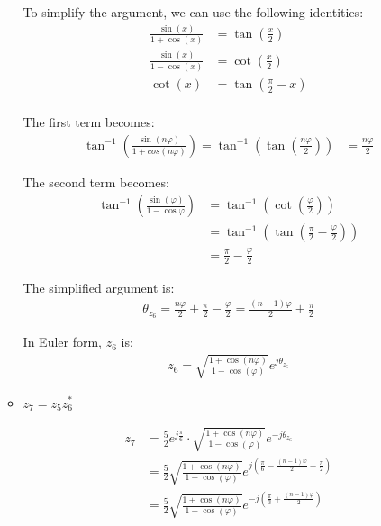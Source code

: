 \documentclass{article}
\begin{document}
\begin{enumerate}
\begin{itemize}
        To simplify the argument, we can use the following identities:
        \begin{align*}
            \frac{\sin(x)}{1+\cos(x)} &= \tan\left(\frac{x}{2}\right) \\
            \frac{\sin(x)}{1-\cos(x)} &= \cot\left(\frac{x}{2}\right) \\
            \cot(x) &= \tan\left(\frac{\pi}{2} - x\right) \\
        \end{align*}

        The first term becomes:
        \begin{align*}
            \tan^{-1}\left(\frac{\sin(n\varphi)}{1+cos(n\varphi)}\right) = \tan^{-1}\left(\tan\left(\frac{n\varphi}{2}\right)\right) &= \frac{n\varphi}{2}
        \end{align*}

        The second term becomes:
        \begin{align*}
            \tan^{-1}\left(\frac{\sin(\varphi)}{1-\cos{\varphi}}\right) &= \tan^{-1}\left(\cot\left(\frac{\varphi}{2}\right)\right) \\
            &= \tan^{-1}\left(\tan\left(\frac{\pi}{2} - \frac{\varphi}{2}\right)\right) \\
            &= \frac{\pi}{2} - \frac{\varphi}{2}
        \end{align*}

        The simplified argument is:
        \begin{align*}
            \theta_{z_6} = \frac{n\varphi}{2} + \frac{\pi}{2} - \frac{\varphi}{2} = \frac{(n-1)\varphi}{2} + \frac{\pi}{2}
        \end{align*}

        In Euler form, $z_6$ is:
        \begin{align*}
            z_6 = \sqrt{\frac{1+\cos(n\varphi)}{1-\cos(\varphi)}}e^{j\theta_{z_6}}
        \end{align*}

        \item $z_7 = z_5z^*_6$

        \begin{align*}
            z_7 &= \frac{5}{2}e^{j\frac{\pi}{6}} \cdot \sqrt{\frac{1+\cos(n\varphi)}{1-\cos(\varphi)}}e^{-j\theta_{z_6}} \\
            &= \frac{5}{2}\sqrt{\frac{1+\cos(n\varphi)}{1-\cos(\varphi)}}e^{j\left(\frac{\pi}{6} - \frac{(n-1)\varphi}{2} - \frac{\pi}{2}\right)} \\
            &= \frac{5}{2}\sqrt{\frac{1+\cos(n\varphi)}{1-\cos(\varphi)}}e^{-j\left(\frac{\pi}{3} + \frac{(n-1)\varphi}{2}\right)} \\
        \end{align*}
    \end{itemize}


\end{enumerate}
\end{document}
